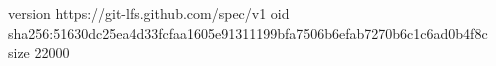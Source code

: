 version https://git-lfs.github.com/spec/v1
oid sha256:51630dc25ea4d33fcfaa1605e91311199bfa7506b6efab7270b6c1c6ad0b4f8c
size 22000
